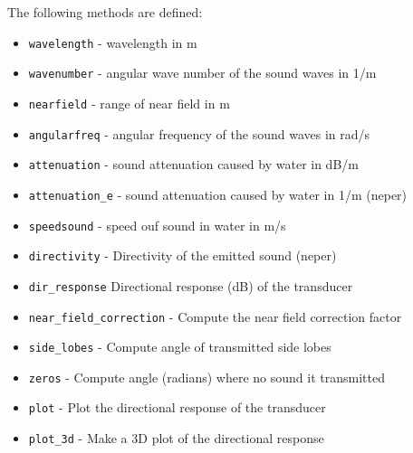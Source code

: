 \documentclass[]{article}
\begin{document}
The following methods are defined:
\begin{itemize}
  \item \lstinline!wavelength! - wavelength in m
  \item \lstinline!wavenumber! - angular wave number of the sound waves in 1/m
  \item \lstinline!nearfield! - range of near field in m
  \item \lstinline!angularfreq! - angular frequency of the sound waves in rad/s
  \item \lstinline!attenuation! - sound attenuation caused by water in dB/m
  \item \lstinline!attenuation_e! - sound attenuation caused by water in 1/m (neper)
  \item \lstinline!speedsound! - speed ouf sound in water in m/s
  \item \lstinline!directivity! - Directivity of the emitted sound (neper)
  \item \lstinline!dir_response! Directional response (dB) of the transducer
  \item \lstinline!near_field_correction! - Compute the near field correction factor
  \item \lstinline!side_lobes! - Compute angle of transmitted side lobes
  \item \lstinline!zeros! - Compute angle (radians) where no sound it transmitted
  \item \lstinline!plot! - Plot the directional response of the transducer
  \item \lstinline!plot_3d! - Make a 3D plot of the directional response
\end{itemize}


\end{document}
